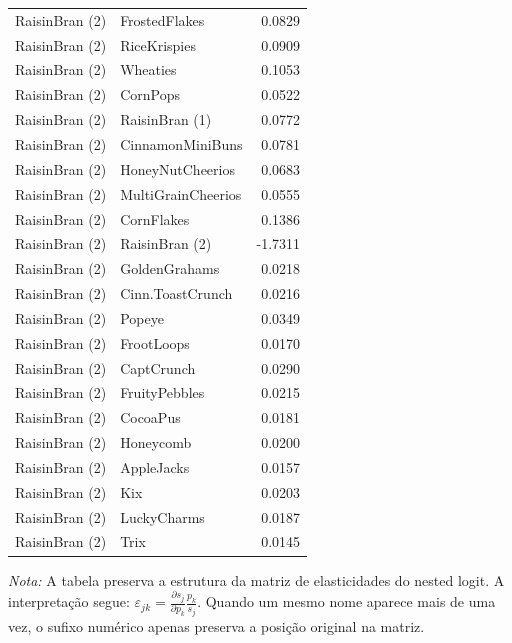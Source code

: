 \begin{table}[H]
\begin{tabular}{llr}
RaisinBran (2) & FrostedFlakes & 0.0829 \\
RaisinBran (2) & RiceKrispies & 0.0909 \\
RaisinBran (2) & Wheaties & 0.1053 \\
RaisinBran (2) & CornPops & 0.0522 \\
RaisinBran (2) & RaisinBran (1) & 0.0772 \\
RaisinBran (2) & CinnamonMiniBuns & 0.0781 \\
RaisinBran (2) & HoneyNutCheerios & 0.0683 \\
RaisinBran (2) & MultiGrainCheerios & 0.0555 \\
RaisinBran (2) & CornFlakes & 0.1386 \\
RaisinBran (2) & RaisinBran (2) & -1.7311 \\
RaisinBran (2) & GoldenGrahams & 0.0218 \\
RaisinBran (2) & Cinn.ToastCrunch & 0.0216 \\
RaisinBran (2) & Popeye & 0.0349 \\
RaisinBran (2) & FrootLoops & 0.0170 \\
RaisinBran (2) & CaptCrunch & 0.0290 \\
RaisinBran (2) & FruityPebbles & 0.0215 \\
RaisinBran (2) & CocoaPus & 0.0181 \\
RaisinBran (2) & Honeycomb & 0.0200 \\
RaisinBran (2) & AppleJacks & 0.0157 \\
RaisinBran (2) & Kix & 0.0203 \\
RaisinBran (2) & LuckyCharms & 0.0187 \\
RaisinBran (2) & Trix & 0.0145 \\
\bottomrule
\end{tabular}

\vspace{0.3em}
\footnotesize
\textit{Nota:} A tabela preserva a estrutura da matriz de elasticidades do nested logit. A interpretação segue: $\varepsilon_{jk}=\frac{\partial s_j}{\partial p_k}\frac{p_k}{s_j}$. Quando um mesmo nome aparece mais de uma vez, o sufixo numérico apenas preserva a posição original na matriz.
\end{table}
\endgroup


